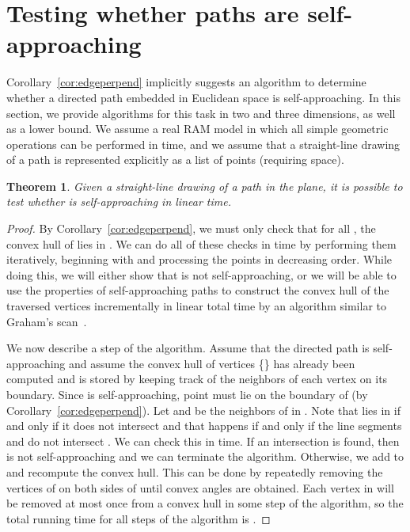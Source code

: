 \documentclass[11pt]{article}
\newtheorem{theorem}{Theorem}
\newcommand{\ignore}[1]{}
\newcommand{\changeA}[1]{{#1}}
\begin{document}
\section{Testing whether paths are self-approaching}
\label{sec:testingPaths}
Corollary~\ref{cor:edgeperpend} implicitly suggests an algorithm to determine whether a directed path embedded in Euclidean space is self-approaching.  In this section, we provide \ignore{improved} algorithms for this task in two and three dimensions, as well as a lower bound.  We assume a real RAM model in which all simple geometric operations can be performed in  time, and we assume that a straight-line drawing of a path  is represented explicitly as a list of  points (requiring  space).
\begin{theorem}
\label{thm:pathSolver}
Given a straight-line drawing of a path  in the plane, it is possible to test whether  is self-approaching in linear time.
\end{theorem}
\begin{proof}
By Corollary~\ref{cor:edgeperpend}, we must only check that for all , the convex hull of  lies in .  We can do all of these checks in  time by performing them iteratively, beginning with  and processing the points in decreasing order.  While doing this, we will either show that  is not self-approaching, or we will be able to use the properties of self-approaching paths to construct the convex hull of the traversed vertices incrementally in linear total time by an algorithm similar to Graham's scan~\cite{Graham}.

We now describe a step of the algorithm.  Assume that the directed path  is self-approaching and assume the convex hull  of vertices \{\} has already been computed and is stored by keeping track of the neighbors of each vertex on its boundary.  Since  is self-approaching, point  must lie on the boundary of  (by Corollary~\ref{cor:edgeperpend}).  Let  and  be the neighbors of  in .
\changeA{Note that  lies in  if and only if it does not intersect  and that happens if and only if the line segments  and  do not intersect .}
We can check this in  time.
If an intersection is found, then  is not self-approaching and we can terminate the algorithm.  Otherwise, we add  to  and recompute the convex hull.  This can be done by repeatedly removing the vertices of  on both sides of  until convex angles are obtained\ignore{, after which the convex hull of  will remain}.  Each vertex in  will be removed at most once from a convex hull in some step of the algorithm, so the total running time for all steps of the algorithm is .
\end{proof}
\end{document}
